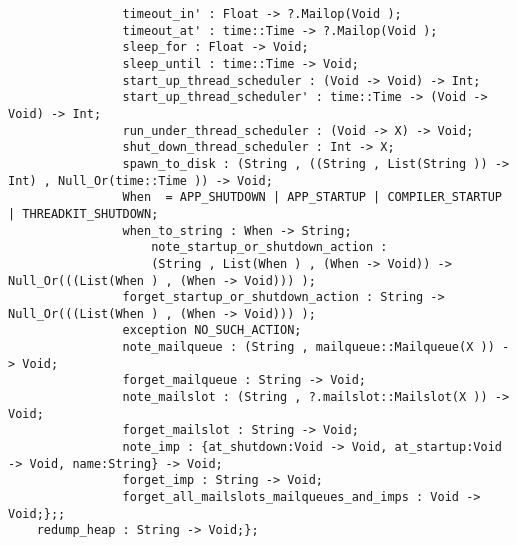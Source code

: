 \begin{verbatim}
                timeout_in' : Float -> ?.Mailop(Void );
                timeout_at' : time::Time -> ?.Mailop(Void );
                sleep_for : Float -> Void;
                sleep_until : time::Time -> Void;
                start_up_thread_scheduler : (Void -> Void) -> Int;
                start_up_thread_scheduler' : time::Time -> (Void -> Void) -> Int;
                run_under_thread_scheduler : (Void -> X) -> Void;
                shut_down_thread_scheduler : Int -> X;
                spawn_to_disk : (String , ((String , List(String )) -> Int) , Null_Or(time::Time )) -> Void;
                When  = APP_SHUTDOWN | APP_STARTUP | COMPILER_STARTUP | THREADKIT_SHUTDOWN;
                when_to_string : When -> String;
                    note_startup_or_shutdown_action :
                    (String , List(When ) , (When -> Void)) -> Null_Or(((List(When ) , (When -> Void))) );
                forget_startup_or_shutdown_action : String -> Null_Or(((List(When ) , (When -> Void))) );
                exception NO_SUCH_ACTION;
                note_mailqueue : (String , mailqueue::Mailqueue(X )) -> Void;
                forget_mailqueue : String -> Void;
                note_mailslot : (String , ?.mailslot::Mailslot(X )) -> Void;
                forget_mailslot : String -> Void;
                note_imp : {at_shutdown:Void -> Void, at_startup:Void -> Void, name:String} -> Void;
                forget_imp : String -> Void;
                forget_all_mailslots_mailqueues_and_imps : Void -> Void;};;
    redump_heap : String -> Void;};
\end{verbatim}
